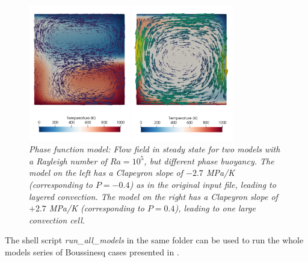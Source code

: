 \begin{figure}
\includegraphics[width=0.8\textwidth]{cookbooks/christensen_yuen_phase_function/doc/flow_field.png}
\caption{\it Phase function model: Flow field in steady state for two models with a Rayleigh number of $Ra = 10^5$, but different phase buoyancy. The model on the left has a Clapeyron slope of $-2.7$ MPa/K (corresponding to $P=-0.4$) as in the original input file, leading to layered convection. The model on the right has a Clapeyron slope of $+2.7$ MPa/K (corresponding to $P=0.4$), leading to one large convection cell.}
\label{fig:christensen_yuen}
\end{figure}

The shell script {\sl run\_all\_models} in the same folder can be used to run the whole models series of Boussinesq cases presented in \cite{CY85}.  
